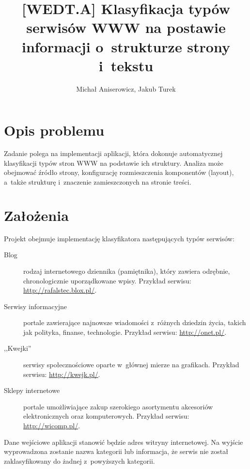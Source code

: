 \documentclass[a4paper,10pt]{article}
\title{[WEDT.A] Klasyfikacja typów serwisów WWW na postawie informacji o~strukturze strony i~tekstu}
\author{Michał Aniserowicz, Jakub Turek}
\date{}
\begin{document}
\maketitle

\section*{Opis problemu}

Zadanie polega na implementacji aplikacji, która dokonuje automatycznej klasyfikacji typów stron WWW na podstawie ich  struktury. Analiza może obejmować źródło strony, konfigurację rozmieszczenia komponentów (layout), a~także strukturę i~znaczenie zamieszczonych na stronie treści.

\section*{Założenia}

Projekt obejmuje implementację klasyfikatora następujących typów serwisów:

\begin{description}
 \item [Blog] rodzaj internetowego dziennika (pamiętnika), który zawiera odrębnie, chronologicznie uporządkowane wpisy. Przykład serwisu: \url{http://rafalstec.blox.pl/}.
 \item [Serwisy informacyjne] portale zawierające najnowsze wiadomości z~różnych dziedzin życia, takich jak polityka, finanse, technologie. Przykład serwisu: \url{http://onet.pl/}.
 \item [,,Kwejki''] serwisy społecznościowe oparte w~głównej mierze na grafikach. Przykład serwisu: \url{http://kwejk.pl/}.
 \item [Sklepy internetowe] portale umożliwiające zakup szerokiego asortymentu akcesoriów elektronicznych oraz komputerowych. Przykład serwisu: \url{http://wicomp.pl/}.
\end{description}

Dane wejściowe aplikacji stanowić będzie adres witryny internetowej. Na wyjście wyprowadzona zostanie nazwa kategorii lub informacja, że serwis nie został zaklasyfikowany do żadnej z~powyższych kategorii.
\end{document}
